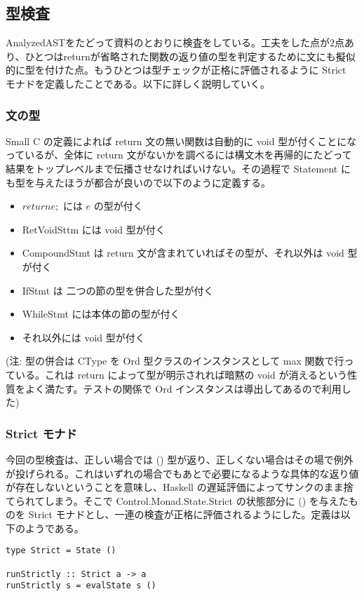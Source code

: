 \documentclass{jsarticle}
\begin{document}
\subsection{型検査}
AnalyzedASTをたどって資料のとおりに検査をしている。工夫をした点が2点あり、ひとつはreturnが省略された関数の返り値の型を判定するために文にも擬似的に型を付けた点。もうひとつは型チェックが正格に評価されるように Strict モナドを定義したことである。以下に詳しく説明していく。
\subsubsection{文の型}
Small C の定義によれば return 文の無い関数は自動的に void 型が付くことになっているが、全体に return 文がないかを調べるには構文木を再帰的にたどって結果をトップレベルまで伝播させなければいけない。その過程で Statement にも型を与えたほうが都合が良いので以下のように定義する。
\begin{itemize}
\item $return e;$ には $e$ の型が付く
\item RetVoidSttm には void 型が付く
\item CompoundStmt は return 文が含まれていればその型が、それ以外は void 型が付く
\item IfStmt は 二つの節の型を併合した型が付く
\item WhileStmt には本体の節の型が付く
\item それ以外には void 型が付く
\end{itemize}

(注: 型の併合は CType を Ord 型クラスのインスタンスとして max 関数で行っている。これは return によって型が明示されれば暗黙の void が消えるという性質をよく満たす。テストの関係で Ord インスタンスは導出してあるので利用した)

\subsubsection{Strict モナド}
今回の型検査は、正しい場合では () 型が返り、正しくない場合はその場で例外が投げられる。これはいずれの場合でもあとで必要になるような具体的な返り値が存在しないということを意味し、Haskell の遅延評価によってサンクのまま捨てられてしまう。そこで Control.Monad.State.Strict の状態部分に () を与えたものを Strict モナドとし、一連の検査が正格に評価されるようにした。定義は以下のようである。
\begin{verbatim}
type Strict = State ()

runStrictly :: Strict a -> a
runStrictly s = evalState s ()
\end{verbatim}
\end{document}
